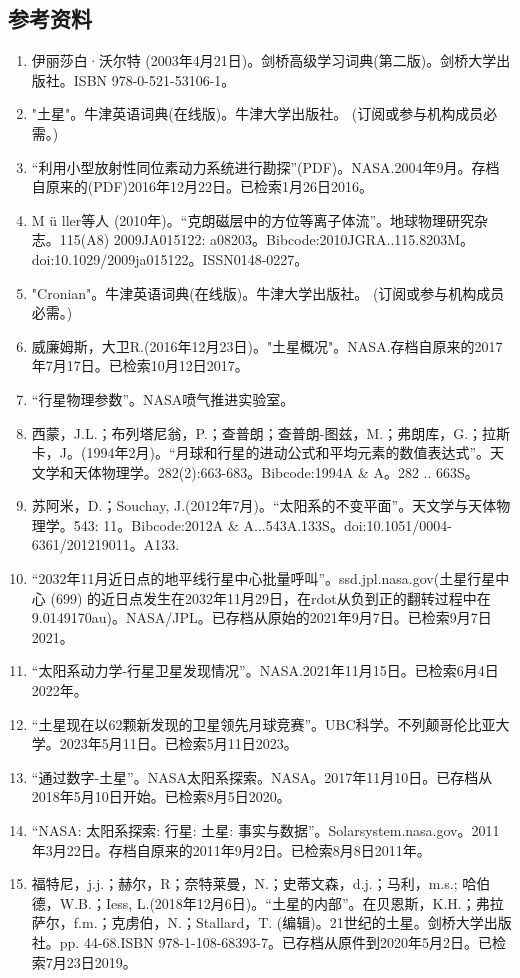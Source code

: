 \subsection{参考资料}
\begin{enumerate}
\item 伊丽莎白·沃尔特 (2003年4月21日)。剑桥高级学习词典(第二版)。剑桥大学出版社。ISBN 978-0-521-53106-1。
\item "土星"。牛津英语词典(在线版)。牛津大学出版社。 (订阅或参与机构成员必需。)
\item “利用小型放射性同位素动力系统进行勘探”(PDF)。NASA.2004年9月。存档自原来的(PDF)2016年12月22日。已检索1月26日2016。
\item M ü ller等人 (2010年)。“克朗磁层中的方位等离子体流”。地球物理研究杂志。115(A8) 2009JA015122: a08203。Bibcode:2010JGRA..115.8203M。doi:10.1029/2009ja015122。ISSN0148-0227。 
\item "Cronian"。牛津英语词典(在线版)。牛津大学出版社。 (订阅或参与机构成员必需。)
\item 威廉姆斯，大卫R.(2016年12月23日)。"土星概况"。NASA.存档自原来的2017年7月17日。已检索10月12日2017。
\item “行星物理参数”。NASA喷气推进实验室。
\item 西蒙，J.L.；布列塔尼翁，P.；查普朗；查普朗-图兹，M.；弗朗库，G.；拉斯卡，J。(1994年2月)。“月球和行星的进动公式和平均元素的数值表达式”。天文学和天体物理学。282(2):663-683。Bibcode:1994A & A。282 .. 663S。
\item 苏阿米，D.；Souchay, J.(2012年7月)。“太阳系的不变平面”。天文学与天体物理学。543: 11。Bibcode:2012A & A...543A.133S。doi:10.1051/0004-6361/201219011。A133.
\item “2032年11月近日点的地平线行星中心批量呼叫”。ssd.jpl.nasa.gov(土星行星中心 (699) 的近日点发生在2032年11月29日，在rdot从负到正的翻转过程中在9.0149170au)。NASA/JPL。已存档从原始的2021年9月7日。已检索9月7日2021。
\item “太阳系动力学-行星卫星发现情况”。NASA.2021年11月15日。已检索6月4日2022年。
\item “土星现在以62颗新发现的卫星领先月球竞赛”。UBC科学。不列颠哥伦比亚大学。2023年5月11日。已检索5月11日2023。
\item “通过数字-土星”。NASA太阳系探索。NASA。2017年11月10日。已存档从2018年5月10日开始。已检索8月5日2020。
\item “NASA: 太阳系探索: 行星: 土星: 事实与数据”。Solarsystem.nasa.gov。2011年3月22日。存档自原来的2011年9月2日。已检索8月8日2011年。
\item 福特尼，j.j.；赫尔，R；奈特莱曼，N.；史蒂文森，d.j.；马利，m.s.; 哈伯德，W.B.；Iess, L.(2018年12月6日)。“土星的内部”。在贝恩斯，K.H.；弗拉萨尔，f.m.；克虏伯，N.；Stallard，T. (编辑)。21世纪的土星。剑桥大学出版社。pp. 44-68.ISBN 978-1-108-68393-7。已存档从原件到2020年5月2日。已检索7月23日2019。

\end{enumerate}
